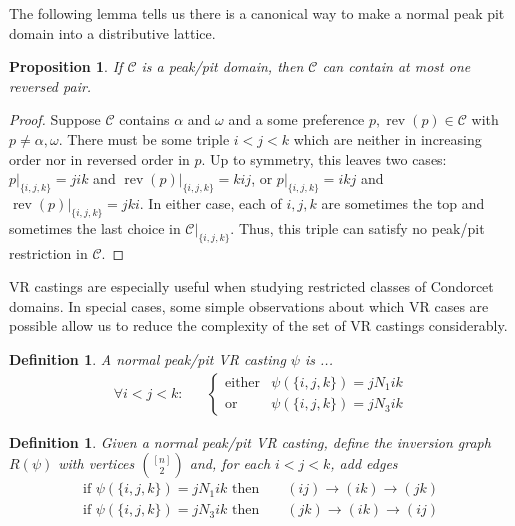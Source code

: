 \documentclass[12pt]{article}
\newtheorem{definition}[theorem]{Definition}
\newtheorem{proposition}[theorem]{Proposition}
\newcommand{\C}{\mathcal{C}}
\DeclareMathOperator*{\rev}{rev}
\newcommand{\1}[1]{\mathds{1}[{#1}]}
\begin{document}
  The following lemma tells us there is a canonical way to make a normal peak
  pit domain into a distributive lattice.
  \begin{proposition}
    If $\C$ is a peak/pit domain, then $\C$ can contain at most one reversed
    pair.
  \end{proposition}
  \begin{proof}
    Suppose $\C$ contains $\alpha$ and $\omega$ and a some preference 
    $p, \rev(p)\in \C$ with $p\ne \alpha, \omega$.
    There must be some triple $i<j<k$ which are neither in increasing order nor
    in reversed order in $p$.
    Up to symmetry, this leaves two cases: $p|_{\{i,j,k\}} = jik$
    and $\rev(p)|_{\{i,j,k\}} = kij$,
    or  $p|_{\{i,j,k\}} = ikj$ and $\rev(p)|_{\{i,j,k\}} = jki$.
    In either case, each of $i,j,k$ are sometimes the top and sometimes
    the last choice in $\C|_{\{i,j,k\}}$.
    Thus, this triple can satisfy no peak/pit restriction in $\C$.
  \end{proof}

  VR castings are especially useful when studying restricted classes of
  Condorcet domains. In special cases, some simple observations about which VR
  cases are possible allow us to reduce the complexity of the set of VR castings
  considerably.

  \begin{definition}
    A normal peak/pit VR casting $\psi$ is ...
    \begin{align*}
      \forall i<j<k:
      &&
      \begin{cases}
        \text{either} &  \psi(\{i,j,k\}) = j N_1 ik \\
        \text{or} &  \psi(\{i,j,k\}) = j N_3 ik
      \end{cases}
    \end{align*}
  \end{definition}
  \begin{definition}
    Given a normal peak/pit VR casting, define the inversion graph $R(\psi)$
    with vertices $[n] \choose 2$ and, for each $i<j<k$, add edges
    \begin{align*}
      \text{if $\psi(\{i,j,k\}) = j N_1 ik$ then }
      && (ij) \longrightarrow (ik) \longrightarrow (jk) \\
      \text{if $\psi(\{i,j,k\}) = j N_3 ik$ then }
      && (jk) \longrightarrow (ik) \longrightarrow (ij) \\
    \end{align*}
  \end{definition}
\end{document}

